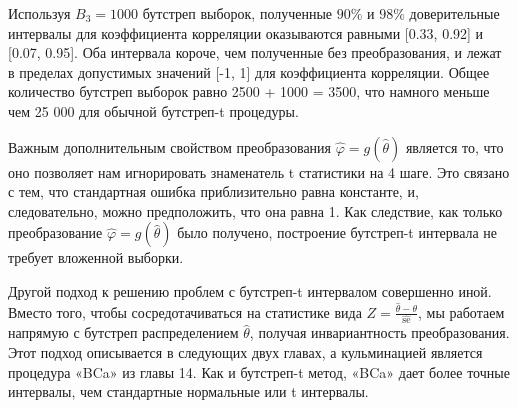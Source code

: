 \begin{figure}[ht]
\end{figure}


Используя $ B_{3} = 1000$ бутстреп выборок, полученные $90\%$ и $98\%$ доверительные интервалы для коэффициента корреляции оказываются равными [0.33, 0.92] и [0.07, 0.95]. Оба интервала короче, чем полученные без преобразования, и лежат в пределах допустимых значений [-1, 1] для коэффициента корреляции. Общее количество бутстреп выборок равно 2500 + 1000 = 3500, что намного меньше чем 25 000 для обычной бутстреп-t процедуры.

Важным дополнительным свойством преобразования $\widehat{\varphi} = g (\widehat{\theta})$ является то, что оно позволяет нам игнорировать знаменатель t статистики  на 4 шаге. Это связано с тем, что стандартная ошибка приблизительно равна константе, и, следовательно, можно предположить, что она равна 1. Как следствие, как только преобразование $\widehat{\varphi} = g (\widehat{\theta})$ было получено, построение бутстреп-t интервала не требует вложенной выборки.

Другой подход к решению проблем с бутстреп-t интервалом совершенно иной. Вместо того, чтобы сосредотачиваться на статистике вида $Z = \frac{\widehat{\theta} - \theta}{\widehat{\text{se}}}$, мы работаем напрямую с бутстреп распределением $\widehat{\theta}$, получая инвариантность преобразования.
Этот подход описывается в следующих двух главах, а кульминацией является процедура «BCa» из главы 14. Как и бутстреп-t метод, «BCa» дает более точные интервалы, чем стандартные нормальные или t интервалы.

